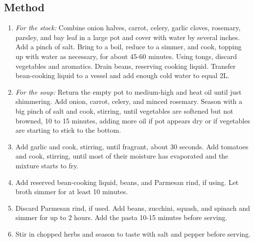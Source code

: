 \subsection{Method}

\begin{enumerate}
    \item \emph{For the stock:} Combine onion halves, carrot, celery, garlic cloves, rosemary, parsley, and bay leaf in a large pot and cover with water by several inches. Add a pinch of salt. Bring to a boil, reduce to a simmer, and cook, topping up with water as necessary, for about 45-60 minutes. Using tongs, discard vegetables and aromatics. Drain beans, reserving cooking liquid. Transfer bean-cooking liquid to a vessel and add enough cold water to equal 2L.
    \item \emph{For the soup:} Return the empty pot to medium-high and heat oil until just shimmering. Add onion, carrot, celery, and minced rosemary. Season with a big pinch of salt and cook, stirring, until vegetables are softened but not browned, 10 to 15 minutes, adding more oil if pot appears dry or if vegetables are starting to stick to the bottom.
    \item Add garlic and cook, stirring, until fragrant, about 30 seconds. Add tomatoes and cook, stirring, until most of their moisture has evaporated and the mixture starts to fry.
    \item Add reserved bean-cooking liquid, beans, and Parmesan rind, if using. Let broth simmer for at least 10 minutes.
    \item Discard Parmesan rind, if used. Add beans, zucchini, squash, and spinach and simmer for up to 2 hours. Add the pasta 10-15 minutes before serving.
    \item Stir in chopped herbs and season to taste with salt and pepper before serving.
\end{enumerate}

